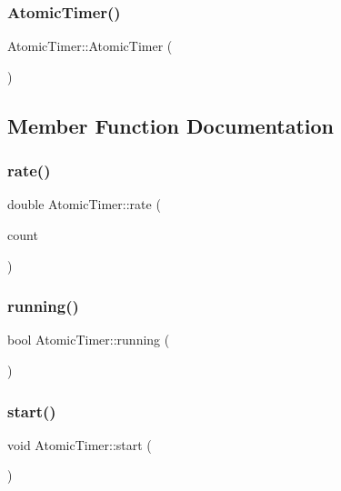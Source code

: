 \subsubsection{\texorpdfstring{Atomic\+Timer()}{AtomicTimer()}}
{\footnotesize\ttfamily Atomic\+Timer\+::\+Atomic\+Timer (\begin{DoxyParamCaption}{ }\end{DoxyParamCaption})\hspace{0.3cm}{\ttfamily [inline]}}



\subsection{Member Function Documentation}
\mbox{\label{class_atomic_timer_ae58f2ba3f8e959463fefa25f34598c1f}} 
\subsubsection{\texorpdfstring{rate()}{rate()}}
{\footnotesize\ttfamily double Atomic\+Timer\+::rate (\begin{DoxyParamCaption}\item[{const \mbox{\hyperlink{struct_atomic_counter}{Atomic\+Counter}} \&}]{count }\end{DoxyParamCaption})}

\mbox{\label{class_atomic_timer_ad5f9e4d90df46febd93d142036ae5cc9}} 
\subsubsection{\texorpdfstring{running()}{running()}}
{\footnotesize\ttfamily bool Atomic\+Timer\+::running (\begin{DoxyParamCaption}{ }\end{DoxyParamCaption})}

\mbox{\label{class_atomic_timer_ad3e5da55d9fafde1d848bf238ae5a8cd}} 
\subsubsection{\texorpdfstring{start()}{start()}}
{\footnotesize\ttfamily void Atomic\+Timer\+::start (\begin{DoxyParamCaption}{ }\end{DoxyParamCaption})}

